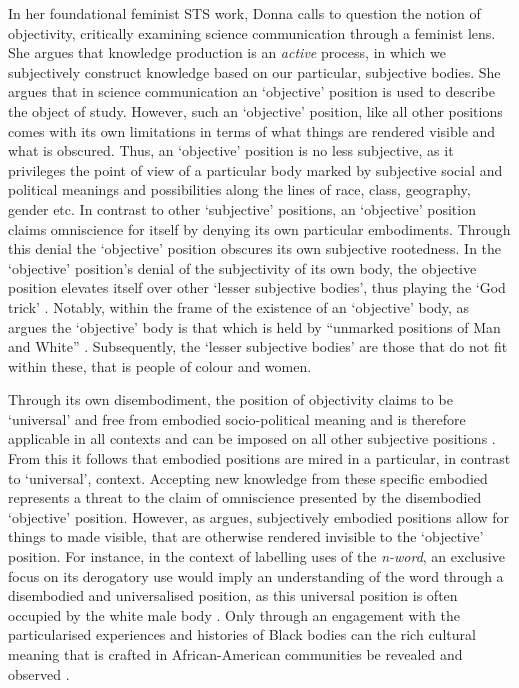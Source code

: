 In her foundational feminist STS work, Donna \citet{Haraway:1988} calls to question the notion of objectivity, critically examining science communication through a feminist lens.
She argues that knowledge production is an \textit{active} process, in which we subjectively construct knowledge based on our particular, subjective bodies.
She argues that in science communication an `objective' position is used to describe the object of study.
However, such an `objective' position, like all other positions comes with its own limitations in terms of what things are rendered visible and what is obscured.
Thus, an `objective' position is no less subjective, as it privileges the point of view of a particular body marked by subjective social and political meanings and possibilities along the lines of race, class, geography, gender etc. 
In contrast to other `subjective' positions, an `objective' position claims omniscience for itself by denying its own particular embodiments.
Through this denial the `objective' position obscures its own subjective rootedness.
In the `objective' position's denial of the subjectivity of its own body, the objective position elevates itself over other `lesser subjective bodies', thus playing the `God trick' \citep{Haraway:1988}.
Notably, within the frame of the existence of an `objective' body, as \citet{Haraway:1988} argues the `objective' body is that which is held by ``unmarked positions of Man and White'' \cite[p. 8]{Haraway:1988}.
Subsequently, the `lesser subjective bodies' are those that do not fit within these, that is people of colour and women.

Through its own disembodiment, the position of objectivity claims to be `universal' and free from embodied socio-political meaning and is therefore applicable in all contexts and can be imposed on all other subjective positions \citep{Mohanty:1984}.
From this it follows that embodied positions are mired in a particular, in contrast to `universal', context.
Accepting new knowledge from these specific embodied represents a threat to the claim of omniscience presented by the disembodied `objective' position.
However, as \citet{Haraway:1988} argues, subjectively embodied positions allow for things to made visible, that are otherwise rendered invisible to the `objective' position.
For instance, in the context of labelling uses of the \textit{n-word}, an exclusive focus on its derogatory use would imply an understanding of the word through a disembodied and universalised position, as this universal position is often occupied by the white male body \citep{Haraway:1988}.
Only through an engagement with the particularised experiences and histories of Black bodies can the rich cultural meaning that is crafted in African-American communities be revealed and observed \citep{Rahman:2012}.


